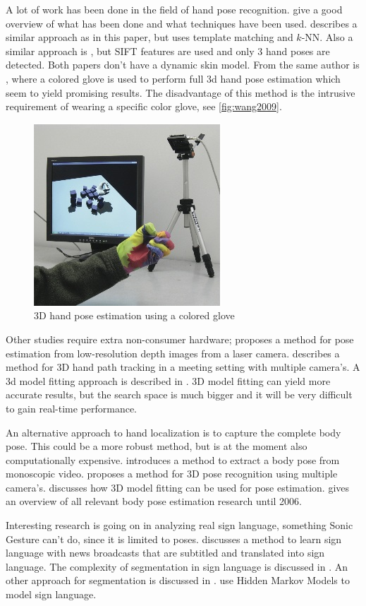 A lot of work has been done in the field of hand pose recognition. \citep{Erol2007, Mitra2007} give a good overview of what has been done and what techniques have been used. \citep{Stenger2006} describes a similar approach as in this paper, but uses template matching and $k$-NN. Also a similar approach  is \citep{Wang2007}, but SIFT features are used and only 3 hand poses are detected. Both papers don't have a dynamic skin model. From the same author is \citep{Wang2009}, where a colored glove is used to perform full 3d hand pose estimation which seem to yield promising results. The disadvantage of this method is the intrusive requirement of wearing a specific color glove, see \autoref{fig:wang2009}.

\begin{figure}[tb]
	\center{}
	\includegraphics[width=0.4\linewidth]{figures/wang2009.jpg}
	\caption{3D hand pose estimation using a colored glove}
	\label{fig:wang2009}
\end{figure}

Other studies require extra non-consumer hardware; \citep{Mo2006} proposes a method for pose estimation from low-resolution depth images from a laser camera. \citep{Xiong2006} describes a method for 3D hand path tracking in a meeting setting with multiple camera's. A 3d model fitting approach is described in \citep{Athitsos2003,laGorce2010}. 3D model fitting can yield more accurate results, but the search space is much bigger and it will be very difficult to gain real-time performance. 

An alternative approach to hand localization is to capture the complete body pose. This could be a more robust method, but is at the moment also computationally expensive. \citep{ferrari2008} introduces a method to extract a body pose from monoscopic video. \citep{VandenBergh2009} proposes a method for 3D pose recognition using multiple camera's. \citep{Poppe2007} discusses how 3D model fitting can be used for pose estimation. \citep{Moeslund2006} gives an overview of all relevant body pose estimation research until 2006.

Interesting research is going on in analyzing real sign language, something Sonic Gesture can't do, since it is limited to poses. \citep{Buehler2009} discusses a method to learn sign language with news broadcasts that are subtitled and translated into sign language. The complexity of segmentation in sign language is discussed in \citep{RichardBowden2004}. An other approach for segmentation is discussed in \citep{Cooper2007}. \citep{starner1998,Vogler1999} use Hidden Markov Models to model sign language.





